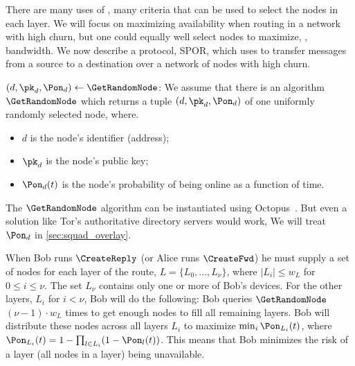 There are many uses of \Sphinxes, many criteria that can be used to select the 
nodes in each layer.
We will focus on maximizing availability when routing in a network with high 
churn, but one could equally well select nodes to maximize, \eg, bandwidth.
We now describe a protocol, \ac{SPOR}, which uses \Sphinxes to transfer messages 
from a source to a destination over a network of nodes with high churn.

\((d, \pk_d, \Pon_d)\gets \GetRandomNode\): We assume that there is an 
algorithm \(\GetRandomNode\) which returns a tuple \((d, \pk_d, \Pon_d)\) of 
one uniformly randomly selected node, where.
\begin{itemize}
  \item \(d\) is the node's identifier (address);
  \item \(\pk_d\) is the node's public key;
  \item \(\Pon_d(t)\) is the node's probability of being online as a function 
    of time.
\end{itemize}
The \(\GetRandomNode\) algorithm can be instantiated using \eg
Octopus~\cite{Octopus}.
But even a solution like Tor's authoritative directory servers would work,
We will treat \(\Pon_d\) in \cref{sec:squad_overlay}.

When Bob runs \(\CreateReply\) (or Alice runs \(\CreateFwd\)) he must supply a 
set of nodes for each layer of the route, \(L = \{L_0, \dotsc, L_\nu\}\), where 
\(|L_i| \leq w_L\) for \(0\leq i\leq \nu\).
The set \(L_\nu\) contains only one or more of Bob's devices.
For the other layers, \(L_i\) for \(i < \nu\), Bob will do the following:
Bob queries \(\GetRandomNode\) \((\nu-1)\cdot w_L\) times to get enough nodes 
to fill all remaining layers.
Bob will distribute these nodes across all layers \(L_i\) to maximize \(\min_i 
  \Pon_{L_i}(t)\), where \(\Pon_{L_i}(t) = 1-\prod_{l\in L_i} 
  (1-\Pon_l(t))\).
This means that Bob minimizes the risk of a layer (\ie all nodes in a layer) 
being unavailable.

